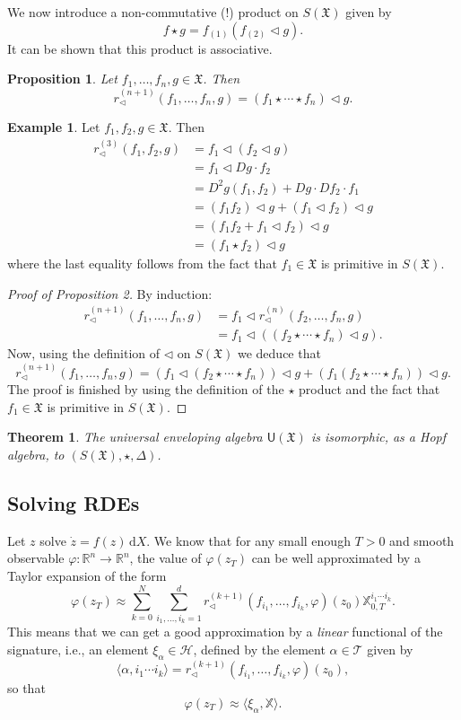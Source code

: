 \documentclass[10pt, reqno]{article}
\theoremstyle{definition}
\newtheorem{example}{Example}
\theoremstyle{plain}
\newtheorem{theorem}{Theorem}
\newtheorem{proposition}{Proposition}
\newcommand{\R}{\mathbb{R}}
\newcommand{\T}{\mathscr{T}}
\newcommand{\bbX}{\mathbb{X}}
\renewcommand{\H}{\mathscr{H}}
\newcommand{\fX}{\mathfrak{X}}
\begin{document}
We now introduce a non-commutative (!) product on \(S(\fX)\) given by
\[
	f\star g=f_{(1)}(f_{(2)}\triangleleft g).
\]
It can be shown that this product is associative.
\begin{proposition}
	Let \(f_1,\dotsc,f_n,g\in\fX\). Then
	\[
		r^{(n+1)}_{\triangleleft}(f_1,\dotsc,f_n,g)=(f_1\star\dotsm\star f_n)\triangleleft g.
	\]
\end{proposition}

\begin{example}
	Let \(f_1,f_2,g\in\fX\). Then
	\begin{align*}
		r^{(3)}_\triangleleft(f_1,f_2,g)&= f_1\triangleleft(f_2\triangleleft g)\\
		&= f_1\triangleleft Dg\cdot f_2\\
		&= D^2g(f_1,f_2)+Dg\cdot Df_2\cdot f_1\\
		&= (f_1f_2)\triangleleft g+(f_1\triangleleft f_2)\triangleleft g\\
		&= (f_1f_2+f_1\triangleleft f_2)\triangleleft g\\
		&= (f_1\star f_2)\triangleleft g
	\end{align*}
	where the last equality follows from the fact that \(f_1\in\fX\) is primitive in \(S(\fX)\).
\end{example}
\begin{proof}[Proof of Proposition 2]
	By induction:
	\begin{align*}
		r^{(n+1)}_\triangleleft(f_1,\dotsc,f_n,g)&= f_1\triangleleft r^{(n)}_\triangleleft(f_2,\dotsc,f_n,g)\\
		&= f_1\triangleleft ((f_2\star\dotsm\star f_n)\triangleleft g).
	\end{align*}
	Now, using the definition of \(\triangleleft\) on \(S(\fX)\) we deduce that
	\[
		r^{(n+1)}_\triangleleft(f_1,\dotsc,f_n,g)=(f_1\triangleleft(f_2\star\dotsm\star f_n))\triangleleft g + (f_1(f_2\star\dotsm\star f_n))\triangleleft g.
	\]
	The proof is finished by using the definition of the \(\star\) product and the fact that \(f_1\in\fX\) is primitive in
	\(S(\fX)\).
\end{proof}

\begin{theorem}
	The universal enveloping algebra \(\mathsf{U}(\fX)\) is isomorphic, as a Hopf algebra, to \((S(\fX),\star,\Delta)\).
\end{theorem}

\subsection{Solving RDEs}
Let \(z\) solve \(\dot z=f(z)\,\mathrm dX\).
We know that for any small enough \(T>0\) and smooth observable \(\varphi\colon\R^n\to\R^n\), the value of \(\varphi(z_T)\) can be
well approximated by a Taylor expansion of the form
\[
	\varphi(z_T)\approx\sum_{k=0}^N\sum_{i_1,\dotsc,i_k=1}^dr^{(k+1)}_\triangleleft(f_{i_1},\dotsc,f_{i_k},\varphi)(z_0)\bbX^{i_1\dotsm i_k}_{0,T}.
\]
This means that we can get a good approximation by a \emph{linear} functional of the signature, i.e., an element
\(\xi_\alpha\in\H\), defined by the element \(\alpha\in\T\) given by
\[
	\langle \alpha,i_1\dotsm i_k\rangle=r^{(k+1)}_\triangleleft(f_{i_1},\dotsc,f_{i_k},\varphi)(z_0),
\]
so that
\[
	\varphi(z_T)\approx\langle \xi_\alpha,\bbX\rangle.
\]
\end{document}
